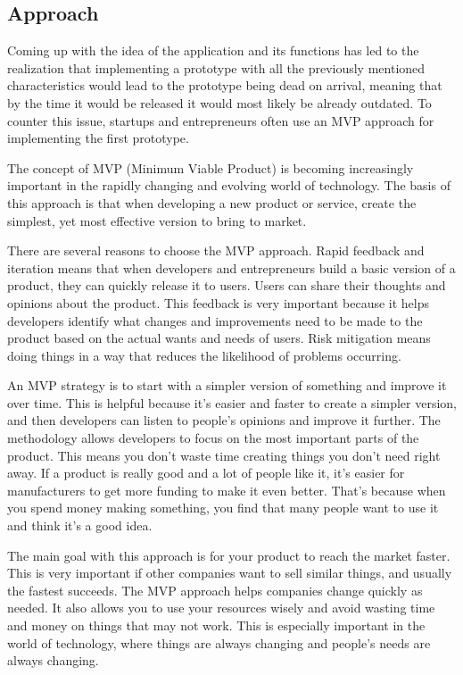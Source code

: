 \subsection{Approach}

Coming up with the idea of the application and its functions has led to the realization that implementing a prototype with all the previously mentioned characteristics would lead to the prototype being dead on arrival, meaning that by the time it would be released it would most likely be already outdated. To counter this issue, startups and entrepreneurs often use an MVP approach for implementing the first prototype. 

The concept of MVP (Minimum Viable Product) is becoming increasingly important in the rapidly changing and evolving world of technology. The basis of this approach is that when developing a new product or service,  create  the simplest, yet most effective version to bring to market. 

There are several reasons to choose the MVP approach.
Rapid feedback and iteration means that when developers and entrepreneurs build a basic version of a product, they can quickly release it to users. Users can  share their thoughts and opinions about the product. This feedback is very important because it helps developers identify what changes and improvements need to be made to the product based on the actual wants and needs of users. Risk mitigation means doing things in a way that reduces the likelihood of problems occurring. 
 
An MVP strategy is to start with a simpler version of something and improve it  over time. This is helpful because it's easier and faster to create a simpler version, and then  developers can listen to people's opinions and improve it further. The methodology allows developers to focus on the most important parts of the product. This means you don't waste time creating things you don't need right away. If a product is really good and a lot of people like it, it's easier for manufacturers to get more funding to make it even better. That's because when you spend money making something, you find that many people want to use it and think it's a good idea. 
 
The main goal with this approach is for your product to reach the market faster. This is very important if other companies want to sell similar things, and usually the fastest succeeds. The MVP approach helps companies change quickly as needed. It also allows you to use your resources wisely and avoid wasting time and money on things that may not work. This is especially important in the world of technology, where things are always changing and people's needs are always changing. 
\newline\cite{mvp}

